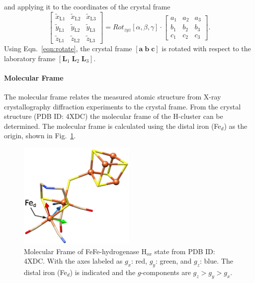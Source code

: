 and applying it to the coordinates of the crystal frame
\begin{equation}
 \begin{bmatrix}
  \tilde{x}_\text{L1} & \tilde{x}_\text{L2} & \tilde{x}_\text{L3} \\
  \tilde{y}_\text{L1} & \tilde{y}_\text{L2} & \tilde{y}_\text{L3} \\
  \tilde{z}_\text{L1} & \tilde{z}_\text{L2} & \tilde{z}_\text{L3} 
  \end{bmatrix} = Rot_{zyz}[\alpha, \beta, \gamma] \cdot \begin{bmatrix}
  a_1 & a_2 & a_3 \\
  b_1 & b_2 & b_3 \\
  c_1 & c_2 & c_3 
  \end{bmatrix}\label{eqn:rotate}.
\end{equation}
Using Eqn.~\ref{eqn:rotate}, the crystal frame $[\mathbf{a}\; \mathbf{b}\; \mathbf{c}]$ is rotated with respect to the laboratory frame $[\mathbf{L}_1\; \mathbf{L}_2\; \mathbf{L}_3]$. 

\paragraph*{Molecular Frame} The molecular frame relates the measured atomic structure from X-ray crystallography diffraction experiments to the crystal frame. From the crystal structure (PDB ID: 4XDC) the molecular frame of the H-cluster can be determined. The molecular frame is calculated using the distal iron (Fe$_d$) as the origin, shown in Fig.~\ref{fig:MolecularFrame}. 

\begin{figure}[ht]
 \centering
 \includegraphics[width=0.5\textwidth]{Kapitel/Ch1-images/Ch2-MolFrame.eps}
 \caption[Molecular Frame of FeFe-hydrogenase H$_{ox}$ state.]{Molecular Frame of FeFe-hydrogenase H$_{ox}$ state from PDB ID: 4XDC. With the axes labeled as $g_x$: red, $g_y$: green, and $g_z$: blue. The distal iron (Fe$_d$) is indicated and the $g$-components are $g_z>g_y>g_x$.}
 \label{fig:MolecularFrame}
\end{figure}

